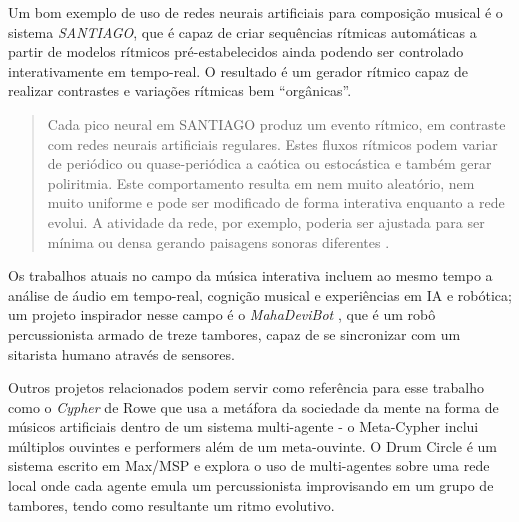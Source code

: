\documentclass{ppgmus}
\begin{document}
Um bom exemplo de uso de redes neurais artificiais para composição musical é o sistema
\textit{SANTIAGO}, que é capaz de criar sequências rítmicas automáticas
a partir de modelos rítmicos pré-estabelecidos ainda podendo ser controlado 
interativamente em tempo-real. O resultado é um gerador rítmico capaz de realizar
contrastes e variações rítmicas bem ``orgânicas''.
 
\begin{quote}
Cada pico neural em SANTIAGO produz um evento rítmico, em contraste com redes neurais artificiais regulares.
Estes fluxos rítmicos podem variar de periódico ou quase-periódica  a caótica ou estocástica e também gerar poliritmia.
Este comportamento resulta em nem muito aleatório, nem muito uniforme e pode ser modificado de forma interativa enquanto a rede evolui.
A atividade da rede, por exemplo, poderia ser ajustada para ser mínima ou densa gerando paisagens sonoras diferentes
\cite{santiago}.
\end{quote}

 
Os trabalhos atuais no campo da música interativa incluem ao mesmo tempo a análise de áudio
em tempo-real, cognição musical e experiências em IA e robótica; um
projeto inspirador nesse campo é o \textit{MahaDeviBot} \cite{kapur07:integrating}, que
é um robô percussionista armado de treze tambores, capaz de se
sincronizar com um sitarista humano através de sensores.

Outros projetos relacionados podem servir como referência para
esse trabalho como o \textit{Cypher} \cite{rowe93:interactive} de Rowe que usa a metáfora da
sociedade da mente \cite{minsky1988society} na forma de músicos artificiais dentro de
um sistema multi-agente - o Meta-Cypher inclui múltiplos ouvintes e
performers além de um meta-ouvinte.  O Drum Circle \cite{eigenfeld07:drum} é um sistema escrito em Max/MSP e explora o uso de
multi-agentes sobre uma rede local onde cada agente emula um
percussionista improvisando em um grupo de tambores, tendo como
resultante um ritmo evolutivo.
\end{document}
